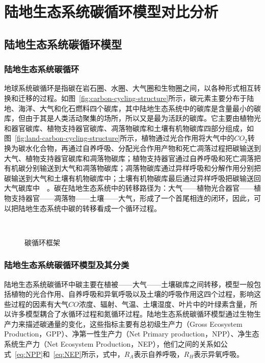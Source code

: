 \chapter{陆地生态系统碳循环模型对比分析}
\label{chap:model}

\section{陆地生态系统碳循环模型}
\label{sec:model}
\subsection{陆地生态系统碳循环}
地球系统碳循环是指碳在岩石圈、水圈、大气圈和生物圈之间，以各种形式相互转换和迁移的过程。如图~\ref{fig:carbon-cycling-structure}所示，碳元素主要分布于陆地、海洋、大气和化石燃料四个碳库，其中陆地生态系统中的碳库是含量最小的碳库，但由于其是人类活动聚集的场所，所以又是最为活跃的碳库。它主要由植物光和器官碳库、植物支持器官碳库、凋落物碳库和土壤有机物碳库四部分组成，如图~\ref{fig:land-carbon-cycling-structure}所示，植物通过光合作用将大气中的$CO_2$转换为碳水化合物，再通过自养呼吸、分配光合作用产物和死亡凋落过程把碳输送到大气、植物支持器官碳库和凋落物碳库；植物支持器官通过自养呼吸和死亡凋落把有机碳分别输送到大气和凋落物碳库；凋落物碳库通过异样呼吸和分解作用分别把碳输送到大气和土壤有机物碳库中；土壤有机物碳库最后通过异样呼吸把碳输送回大气碳库中~\cite{2004地球系统碳循环}~\cite{毛留喜2006陆地生态系统碳循环模型研究概述}。碳在陆地生态系统中的转移路径为：大气——植物光合器官——植物支持器官——凋落物——土壤——大气，形成了一个首尾相连的闭环，因此，可以把陆地生态系统中碳的转移看成一个循环过程。

\begin{figure}[!htbp]
    \centering
    \hfill
     \\
    \caption{碳循环框架}
    \label{fig:carbon-cycling}
\end{figure}

\subsection{陆地生态系统碳循环模型及其分类}
陆地生态系统碳循环中碳主要在植被——大气——土壤碳库之间转移，模型一般包括植物的光合作用、自养呼吸和异氧呼吸以及土壤的呼吸作用这四个过程，影响这些过程的因素有大气$CO$浓度、辐射、气温、土壤湿度、叶片中的叶绿素含量，所以许多模型耦合了水循环过程和氮循环过程。陆地生态系统碳循环模型通过生物生产力来描述碳通量的变化，这些指标主要有总初级生产力（Gross Ecosystem Production，GPP）、净第一性生产力（Net Primary production，NPP）、净生态系统生产力（Net Ecosystem Production，NEP），他们之间的关系如公式~\ref{eq:NPP}和~\ref{eq:NEP}所示，式中，$R_A$表示自养呼吸，$R_H$表示异氧呼吸。

